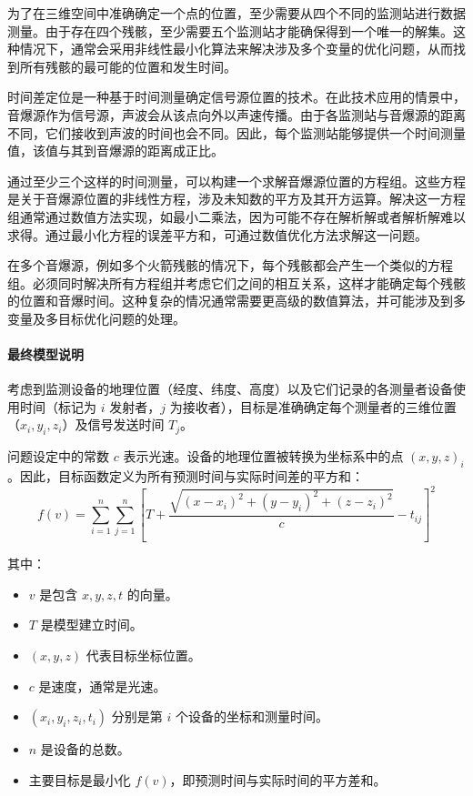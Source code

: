 \documentclass[withoutpreface,bwprint,12pt,a4paper]{cumcmthesis}
\begin{document}
为了在三维空间中准确确定一个点的位置，至少需要从四个不同的监测站进行数据测量。由于存在四个残骸，至少需要五个监测站才能确保得到一个唯一的解集。这种情况下，通常会采用非线性最小化算法来解决涉及多个变量的优化问题，从而找到所有残骸的最可能的位置和发生时间。

时间差定位是一种基于时间测量确定信号源位置的技术。在此技术应用的情景中，音爆源作为信号源，声波会从该点向外以声速传播。由于各监测站与音爆源的距离不同，它们接收到声波的时间也会不同。因此，每个监测站能够提供一个时间测量值，该值与其到音爆源的距离成正比。

通过至少三个这样的时间测量，可以构建一个求解音爆源位置的方程组。这些方程是关于音爆源位置的非线性方程，涉及未知数的平方及其开方运算。解决这一方程组通常通过数值方法实现，如最小二乘法，因为可能不存在解析解或者解析解难以求得。通过最小化方程的误差平方和，可通过数值优化方法求解这一问题。

在多个音爆源，例如多个火箭残骸的情况下，每个残骸都会产生一个类似的方程组。必须同时解决所有方程组并考虑它们之间的相互关系，这样才能确定每个残骸的位置和音爆时间。这种复杂的情况通常需要更高级的数值算法，并可能涉及到多变量及多目标优化问题的处理。

\paragraph{最终模型说明}

考虑到监测设备的地理位置（经度、纬度、高度）以及它们记录的各测量者设备使用时间（标记为 \(i\) 发射者，\(j\) 为接收者），目标是准确确定每个测量者的三维位置（\(x_i, y_i, z_i\)）及信号发送时间 \(T_j\)。

问题设定中的常数 \(c\) 表示光速。设备的地理位置被转换为坐标系中的点 \((x, y, z)_i\)。因此，目标函数定义为所有预测时间与实际时间差的平方和：
\[
f(v) = \sum_{i=1}^n \sum_{j=1}^n \left[ T + \frac{\sqrt{(x-x_i)^2 + (y-y_i)^2 + (z-z_i)^2}}{c} - t_{ij} \right]^2
\]

其中：
\begin{itemize}
    \item \(v\) 是包含 \(x, y, z, t\) 的向量。
    \item \(T\) 是模型建立时间。
    \item \((x, y, z)\) 代表目标坐标位置。
    \item \(c\) 是速度，通常是光速。
    \item \((x_i, y_i, z_i, t_i)\) 分别是第 \(i\) 个设备的坐标和测量时间。
    \item \(n\) 是设备的总数。
    \item 主要目标是最小化 \(f(v)\)，即预测时间与实际时间的平方差和。
\end{itemize}
\end{document}
